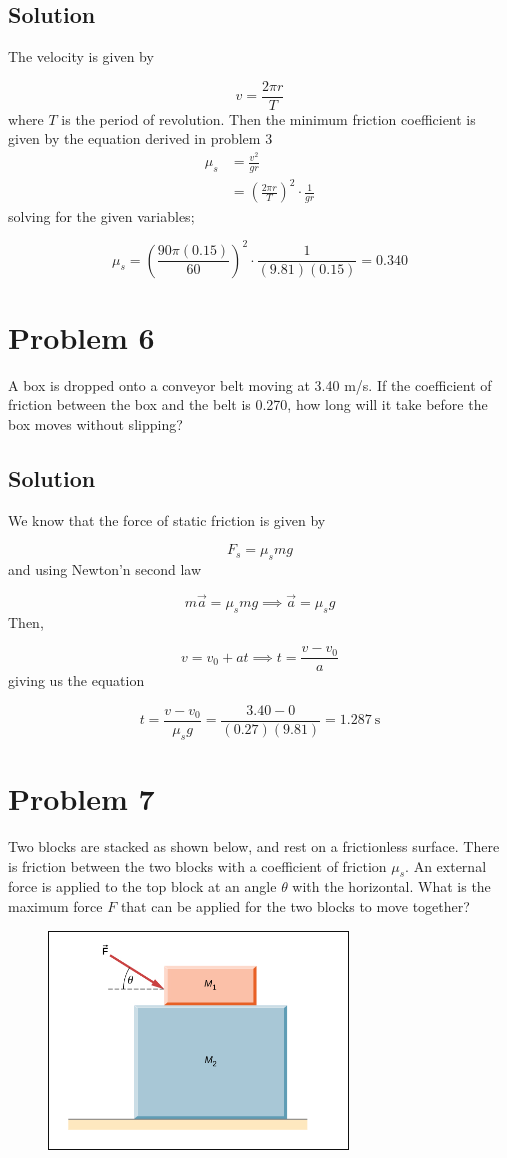 \documentclass{article}
\begin{document}
\subsection*{Solution}
The velocity is given by

\[
	v = \frac{2\pi r}{T}
\]
where $T$ is the period of revolution. Then the minimum friction coefficient is given by the equation derived in problem 3
\begin{align*}
	\mu_s &= \frac{v^2}{gr} \\
	      &= \left(\frac{2\pi r}{T}\right)^2 \cdot \frac{1}{gr}
\end{align*}
solving for the given variables;

\[
	\mu_s = \left(\frac{90\pi(0.15)}{60}\right)^{2}\cdot\frac{1}{(9.81)(0.15)} = \boxed{0.340}
\]

\section*{Problem 6}
A box is dropped onto a conveyor belt moving at 3.40 m/s. If the coefficient of friction
between the box and the belt is 0.270, how long will it take before the box moves without
slipping?

\subsection*{Solution}
We know that the force of static friction is given by

\[
	F_s = \mu_s mg
\]
and using Newton'n second law

\[
	m\vec{a} = \mu_s mg \implies \vec{a} = \mu_s g
\]
Then,

\[
	v = v_0 + at \implies t = \frac{v - v_0}{a}
\]
giving us the equation

\[
	t = \frac{v - v_0}{\mu_s g} = \frac{3.40 - 0}{(0.27)(9.81)} = \boxed{1.287\ \text{s}}
\]

\section*{Problem 7}
Two blocks are stacked as shown below, and rest on a frictionless surface. There is friction
between the two blocks with a coefficient of friction $\mu_s$. An external force is applied to the top
block at an angle $\theta$ with the horizontal. What is the maximum force $F$ that can be applied for
the two blocks to move together?

\begin{figure}[ht]
    \centering
    \includegraphics[scale=.5]{drawing-2.png}
\end{figure}
\end{document}
